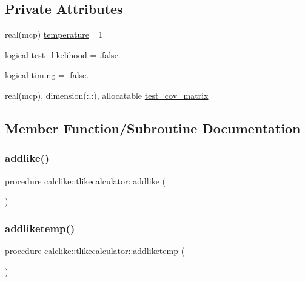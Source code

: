 \subsection*{Private Attributes}
\begin{DoxyCompactItemize}
\item 
real(mcp) \mbox{\hyperlink{structcalclike_1_1tlikecalculator_a3f654546b102cb3103e738bd65dc1fa7}{temperature}} =1
\item 
logical \mbox{\hyperlink{structcalclike_1_1tlikecalculator_a288196a41cc6a6a5d4d3520bf800ebde}{test\+\_\+likelihood}} = .false.
\item 
logical \mbox{\hyperlink{structcalclike_1_1tlikecalculator_ac3070aaf2dfcdf6580cc18713eb15c2c}{timing}} = .false.
\item 
real(mcp), dimension(\+:,\+:), allocatable \mbox{\hyperlink{structcalclike_1_1tlikecalculator_a7129a90edf0fb7b557219e30e3bd1378}{test\+\_\+cov\+\_\+matrix}}
\end{DoxyCompactItemize}


\subsection{Member Function/\+Subroutine Documentation}
\mbox{\label{structcalclike_1_1tlikecalculator_a29ce83d0be67daba46b667a4960ac20b}} 
\subsubsection{\texorpdfstring{addlike()}{addlike()}}
{\footnotesize\ttfamily procedure calclike\+::tlikecalculator\+::addlike (\begin{DoxyParamCaption}{ }\end{DoxyParamCaption})\hspace{0.3cm}{\ttfamily [private]}}

\mbox{\label{structcalclike_1_1tlikecalculator_a6fc9a804088c7682e9752ac6fd42c8b9}} 
\subsubsection{\texorpdfstring{addliketemp()}{addliketemp()}}
{\footnotesize\ttfamily procedure calclike\+::tlikecalculator\+::addliketemp (\begin{DoxyParamCaption}{ }\end{DoxyParamCaption})\hspace{0.3cm}{\ttfamily [private]}}

